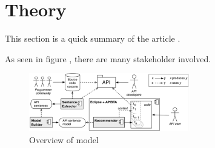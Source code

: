 \section{Theory}
This section is a quick summary of the article \cite{Santos2017stepwise}.

As seen in figure , there are many stakeholder involved.

\begin{figure}[h]
	\centering
	\includegraphics[height=1in]{./section-chapter1/images/overview.png}
	\caption{Overview of model}
	\label{fig:overview}
\end{figure}